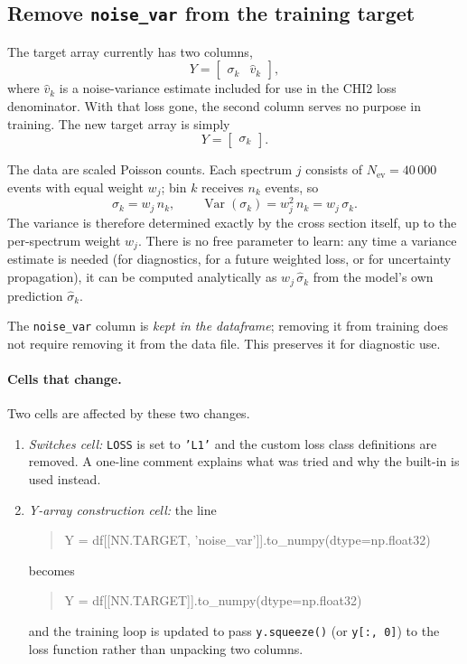 \documentclass[11pt]{article}
\newcommand{\code}[1]{\texttt{#1}}
\begin{document}
\subsection{Remove \code{noise\_var} from the training target}

The target array currently has two columns,
\[
  Y = \begin{bmatrix} \sigma_k & \hat{v}_k \end{bmatrix},
\]
where $\hat{v}_k$ is a noise-variance estimate included for use in the CHI2
loss denominator. With that loss gone, the second column serves no purpose in
training. The new target array is simply
\[
  Y = \begin{bmatrix} \sigma_k \end{bmatrix}.
\]

\begin{aside}
The data are scaled Poisson counts. Each spectrum $j$ consists of $N_\text{ev}
= 40\,000$ events with equal weight $w_j$; bin $k$ receives $n_k$ events, so
\[
  \sigma_k = w_j\,n_k, \qquad
  \operatorname{Var}(\sigma_k) = w_j^2\,n_k = w_j\,\sigma_k.
\]
The variance is therefore determined exactly by the cross section itself, up to
the per-spectrum weight $w_j$. There is no free parameter to learn: any time
a variance estimate is needed (for diagnostics, for a future weighted loss, or
for uncertainty propagation), it can be computed analytically as $w_j\,
\hat{\sigma}_k$ from the model's own prediction $\hat{\sigma}_k$.
\end{aside}

The \code{noise\_var} column is \emph{kept in the dataframe}; removing it from
training does not require removing it from the data file. This preserves it
for diagnostic use.

\paragraph{Cells that change.} Two cells are affected by these two changes.

\begin{enumerate}
  \item \textit{Switches cell:} \code{LOSS} is set to \code{'L1'} and the
    custom loss class definitions are removed. A one-line comment explains what
    was tried and why the built-in is used instead.
  \item \textit{Y-array construction cell:} the line
    \begin{quote}\small\ttfamily
      Y = df[[NN.TARGET, 'noise\_var']].to\_numpy(dtype=np.float32)
    \end{quote}
    becomes
    \begin{quote}\small\ttfamily
      Y = df[[NN.TARGET]].to\_numpy(dtype=np.float32)
    \end{quote}
    and the training loop is updated to pass \code{y.squeeze()} (or
    \code{y[:,\,0]}) to the loss function rather than unpacking two columns.
\end{enumerate}
\end{document}
